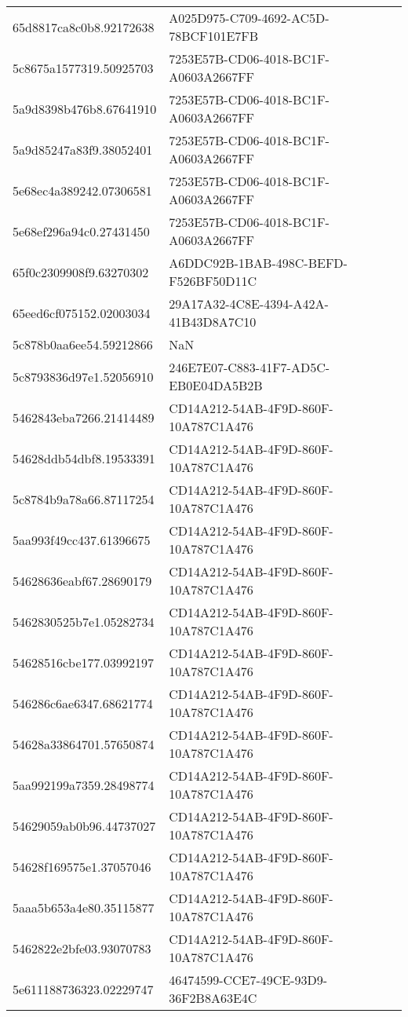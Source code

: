 \begin{tabular}{ll}
65d8817ca8c0b8.92172638 & A025D975-C709-4692-AC5D-78BCF101E7FB \\
5c8675a1577319.50925703 & 7253E57B-CD06-4018-BC1F-A0603A2667FF \\
5a9d8398b476b8.67641910 & 7253E57B-CD06-4018-BC1F-A0603A2667FF \\
5a9d85247a83f9.38052401 & 7253E57B-CD06-4018-BC1F-A0603A2667FF \\
5e68ec4a389242.07306581 & 7253E57B-CD06-4018-BC1F-A0603A2667FF \\
5e68ef296a94c0.27431450 & 7253E57B-CD06-4018-BC1F-A0603A2667FF \\
65f0c2309908f9.63270302 & A6DDC92B-1BAB-498C-BEFD-F526BF50D11C \\
65eed6cf075152.02003034 & 29A17A32-4C8E-4394-A42A-41B43D8A7C10 \\
5c878b0aa6ee54.59212866 & NaN \\
5c8793836d97e1.52056910 & 246E7E07-C883-41F7-AD5C-EB0E04DA5B2B \\
5462843eba7266.21414489 & CD14A212-54AB-4F9D-860F-10A787C1A476 \\
54628ddb54dbf8.19533391 & CD14A212-54AB-4F9D-860F-10A787C1A476 \\
5c8784b9a78a66.87117254 & CD14A212-54AB-4F9D-860F-10A787C1A476 \\
5aa993f49cc437.61396675 & CD14A212-54AB-4F9D-860F-10A787C1A476 \\
54628636eabf67.28690179 & CD14A212-54AB-4F9D-860F-10A787C1A476 \\
5462830525b7e1.05282734 & CD14A212-54AB-4F9D-860F-10A787C1A476 \\
54628516cbe177.03992197 & CD14A212-54AB-4F9D-860F-10A787C1A476 \\
546286c6ae6347.68621774 & CD14A212-54AB-4F9D-860F-10A787C1A476 \\
54628a33864701.57650874 & CD14A212-54AB-4F9D-860F-10A787C1A476 \\
5aa992199a7359.28498774 & CD14A212-54AB-4F9D-860F-10A787C1A476 \\
54629059ab0b96.44737027 & CD14A212-54AB-4F9D-860F-10A787C1A476 \\
54628f169575e1.37057046 & CD14A212-54AB-4F9D-860F-10A787C1A476 \\
5aaa5b653a4e80.35115877 & CD14A212-54AB-4F9D-860F-10A787C1A476 \\
5462822e2bfe03.93070783 & CD14A212-54AB-4F9D-860F-10A787C1A476 \\
5e611188736323.02229747 & 46474599-CCE7-49CE-93D9-36F2B8A63E4C \\

\end{tabular}
